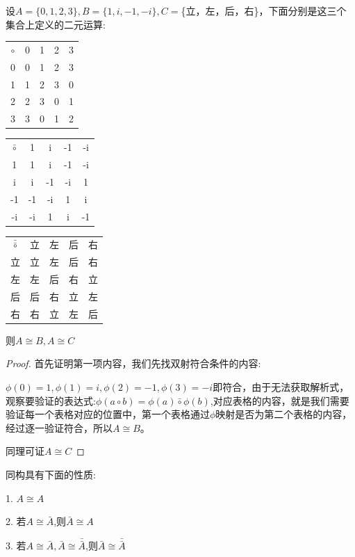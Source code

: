 \documentclass[
	11pt, %
	fleqn, %
	a4paper, %
]{LegrandOrangeBook}
\begin{document}
\begin{example}
	设$A=\{0,1,2,3\},B=\{1,i,-1,-i\},C=$\{立，左，后，右\}，下面分别是这三个集合上定义的二元运算:
	\begin{center}
		\begin{tabular}{c|cccc}

			$\circ$ & 0 & 1 & 2 & 3 \\\cline{1-5}
			0       & 0 & 1 & 2 & 3 \\
			1       & 1 & 2 & 3 & 0 \\
			2       & 2 & 3 & 0 & 1 \\
			3       & 3 & 0 & 1 & 2
		\end{tabular}
		\quad
		\begin{tabular}{c|cccc}

			$\bar{\circ}$ & 1  & i  & -1 & -i \\\cline{1-5}
			1             & 1  & i  & -1 & -i \\
			i             & i  & -1 & -i & 1  \\
			-1            & -1 & -i & 1  & i  \\
			-i            & -i & 1  & i  & -1
		\end{tabular}
		\quad
		\begin{tabular}{c|cccc}

			$\bar{\bar{\circ}}$ & 立 & 左 & 后 & 右 \\\cline{1-5}
			立                  & 立 & 左 & 后 & 右 \\
			左                  & 左 & 后 & 右 & 立 \\
			后                  & 后 & 右 & 立 & 左 \\
			右                  & 右 & 立 & 左 & 后
		\end{tabular}
	\end{center}

	则$A\cong B,A\cong C$
\end{example}

\begin{proof}
	首先证明第一项内容，我们先找双射符合条件的内容:

	$\phi(0)=1,\phi(1)=i,\phi(2)=-1,\phi(3)=-i$即符合，由于无法获取解析式，观察要验证的表达式:$\phi(a\circ b)=\phi(a)\bar{\circ}\phi(b)$,对应表格的内容，就是我们需要验证每一个表格对应的位置中，第一个表格通过$\phi$映射是否为第二个表格的内容，经过逐一验证符合，所以$A\cong B$。

	同理可证$A\cong C$
\end{proof}

\begin{theorem}
	同构具有下面的性质:

	1. $A\cong A$

	2. 若$A\cong \bar{A}$,则$\bar{A}\cong A$

	3. 若$A\cong\bar{A},\bar{A}\cong\bar{\bar{A}}$,则$\bar{A}\cong\bar{\bar{A}}$
\end{theorem}
\end{document}
